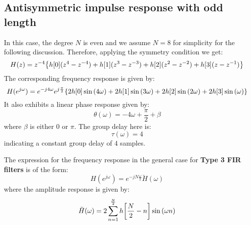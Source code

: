 \documentclass[../../main/main.tex]{subfiles}
\begin{document}
\subsection{Antisymmetric impulse response with odd length}
In this case, the degree \( N \) is even and we assume \( N = 8 \) for simplicity for the following discussion. Therefore, applying the symmetry condition we get:
\begin{equation}
    H(z)
    =
    z^{-4}\qty{h[0](z^{4} - z^{-4}) + h[1](z^{3} - z^{-3}) + h[2](z^{2} - z^{-2}) + h[3](z - z^{-1})}
    \label{eq:L20_S28_1}
\end{equation}
The corresponding frequency response is given by:%
%
\begin{equation}
    H(e^{j\omega})
    =
    e^{-j4\omega} e^{j \frac{\pi}{2}} \qty{2h[0]\sin\qty(4\omega) + 2h[1]\sin\qty(3\omega) + 2h[2]\sin\qty(2\omega) + 2h[3]\sin\qty(\omega)}
    \label{eq:L20_S29_1}
\end{equation}
It also exhibits a linear phase response given by:%
%
\begin{equation}
    \theta(\omega)
    =
    -4\omega + \frac{\pi}{2} + \beta
    \label{eq:L20_S29_2}
\end{equation}
where \( \beta \) is either \( 0 \) or \( \pi \). The group delay here is:
%
\begin{equation}
    \tau(\omega)
    =
    4
    \label{eq:L20_S30_1}
\end{equation}
indicating a constant group delay of \( 4 \) samples.

The expression for the frequency response in the general case for \textbf{Type 3 FIR filters} is of the form:%
\begin{equation}
    H(e^{j\omega})
    =
    e^{-jN \frac{\omega}{2}} \breve{H}(\omega)
    \label{eq:L20_S30_2}
\end{equation}
where the amplitude response is given by:
\begin{equation}
    \breve{H}(\omega)
    =
    2 \sum_{n=1}^{\frac{N}{2}} h\qty[\frac{N}{2} - n] \sin\qty(\omega n)
    \label{eq:L20_S30_3}
\end{equation}
\end{document}
